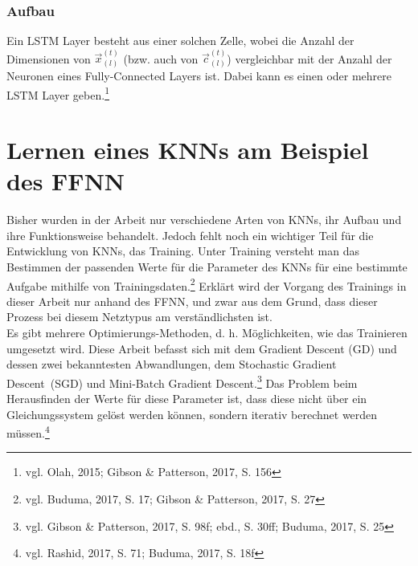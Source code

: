 \documentclass[
	a4paper,
	12pt,
	ngerman,
	oneside
]{scrreprt}											%
\begin{document}
				
			\subsection{Aufbau}
				Ein LSTM Layer besteht aus einer solchen Zelle, wobei die Anzahl der Dimensionen von $\vec{x}_{(l)}^{(t)}$ (bzw. auch von $\vec{c}_{(l)}^{(t)}$) vergleichbar mit der Anzahl der Neuronen eines Fully-Connected Layers ist. Dabei kann es einen oder mehrere LSTM Layer geben.\footnote{vgl. Olah, 2015; Gibson \& Patterson, 2017, S. 156}
				
				
	\chapter{Lernen eines KNNs am Beispiel des FFNN}\label{Lernen}
		Bisher wurden in der Arbeit nur verschiedene Arten von KNNs, ihr Aufbau und ihre Funktionsweise behandelt. Jedoch fehlt noch ein wichtiger Teil für die Entwicklung von KNNs, das Training. Unter Training versteht man das Bestimmen der passenden Werte für die Parameter des KNNs für eine bestimmte Aufgabe mithilfe von Trainingsdaten.\footnote{vgl. Buduma, 2017, S. 17; Gibson \& Patterson, 2017, S. 27} Erklärt wird der Vorgang des Trainings in dieser Arbeit nur anhand des FFNN, und zwar aus dem Grund, dass dieser Prozess bei diesem Netztypus am verständlichsten ist. \\

		
		Es gibt mehrere Optimierungs-Methoden, d. h. Möglichkeiten, wie das Trainieren umgesetzt wird. Diese Arbeit befasst sich mit dem Gradient Descent (GD) und dessen zwei bekanntesten Abwandlungen, dem Stochastic Gradient \mbox{Descent (SGD)} und Mini-Batch Gradient Descent.\footnote{vgl. Gibson \& Patterson, 2017, S. 98f; ebd., S. 30ff; Buduma, 2017, S. 25} Das Problem beim Herausfinden der Werte für diese Parameter ist, dass diese nicht über ein Gleichungssystem gelöst werden können, sondern iterativ berechnet werden müssen.\footnote{vgl. Rashid, 2017, S. 71; Buduma, 2017, S. 18f}
				
\end{document}
